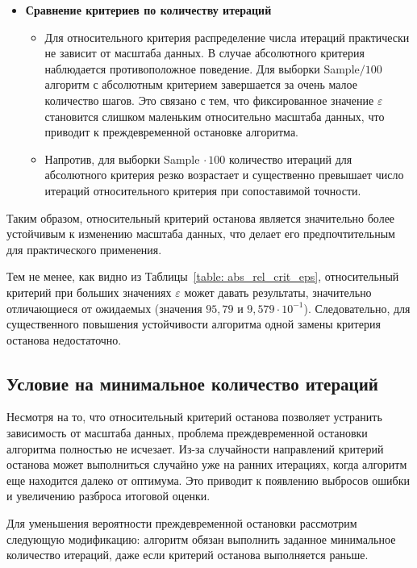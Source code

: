 \begin{itemize}
   \item \textbf{Сравнение критериев по количеству итераций}
      \begin{itemize}
         \item Для относительного критерия распределение числа итераций практически не зависит от масштаба данных. В случае абсолютного критерия наблюдается противоположное поведение. Для выборки Sample$/100$ алгоритм с абсолютным критерием завершается за очень малое количество шагов. Это связано с тем, что фиксированное значение $\varepsilon$ становится слишком маленьким относительно масштаба данных, что приводит к преждевременной остановке алгоритма.
      
         \item Напротив, для выборки Sample$\,\cdot 100$ количество итераций для абсолютного критерия резко возрастает и существенно превышает число итераций относительного критерия при сопоставимой точности.
      \end{itemize}
\end{itemize}

Таким образом, относительный критерий останова является значительно более устойчивым к изменению масштаба данных, что делает его предпочтительным для практического применения.

Тем не менее, как видно из Таблицы~\ref{table: abs_rel_crit_eps}, относительный критерий при больших значениях $\varepsilon$ может давать результаты, значительно отличающиеся от ожидаемых (значения $95{,}79$ и $9{,}579\cdot 10^{-1}$). Следовательно, для существенного повышения устойчивости алгоритма одной замены критерия останова недостаточно.

\subsection{Условие на минимальное количество итераций}

Несмотря на то, что относительный критерий останова позволяет устранить зависимость от масштаба данных, проблема преждевременной остановки алгоритма полностью не исчезает. Из-за случайности направлений критерий останова может выполниться случайно уже на ранних итерациях, когда алгоритм еще находится далеко от оптимума. Это приводит к появлению выбросов ошибки и увеличению разброса итоговой оценки.

Для уменьшения вероятности преждевременной остановки рассмотрим следующую модификацию: алгоритм обязан выполнить заданное минимальное количество итераций, даже если критерий останова выполняется раньше.

